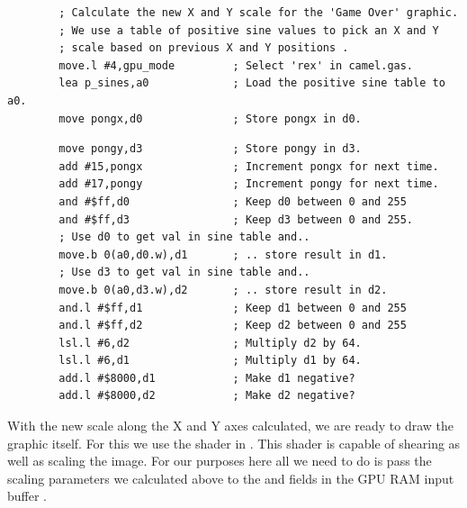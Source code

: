 \begin{lstlisting}
        ; Calculate the new X and Y scale for the 'Game Over' graphic.
        ; We use a table of positive sine values to pick an X and Y
        ; scale based on previous X and Y positions .
        move.l #4,gpu_mode         ; Select 'rex' in camel.gas.
        lea p_sines,a0             ; Load the positive sine table to a0.
        move pongx,d0              ; Store pongx in d0.
\end{lstlisting}
\begin{lstlisting}
        move pongy,d3              ; Store pongy in d3.
        add #15,pongx              ; Increment pongx for next time.
        add #17,pongy              ; Increment pongy for next time.
        and #$ff,d0                ; Keep d0 between 0 and 255
        and #$ff,d3                ; Keep d3 between 0 and 255.
        ; Use d0 to get val in sine table and..
        move.b 0(a0,d0.w),d1       ; .. store result in d1.
        ; Use d3 to get val in sine table and..
        move.b 0(a0,d3.w),d2       ; .. store result in d2.
        and.l #$ff,d1              ; Keep d1 between 0 and 255
        and.l #$ff,d2              ; Keep d2 between 0 and 255
        lsl.l #6,d2                ; Multiply d2 by 64.
        lsl.l #6,d1                ; Multiply d1 by 64.
        add.l #$8000,d1            ; Make d1 negative?
        add.l #$8000,d2            ; Make d2 negative?
\end{lstlisting}

With the new scale along the X and Y axes calculated, we are ready to draw
the graphic itself. For this we use the  shader in .
This shader is capable of shearing as well as scaling the image. For our purposes
here all we need to do is pass the scaling parameters we calculated above to the
 and  fields in the GPU RAM input buffer .

